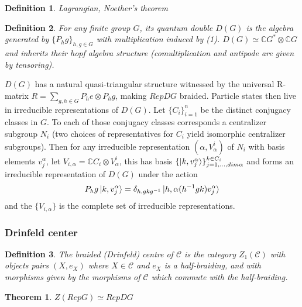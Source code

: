 \documentclass{article}
\newtheorem{definition}{Definition}
\newtheorem{theorem}{Theorem}
\begin{document}
\begin{definition}
Lagrangian, Noether's theorem
\end{definition}
\begin{definition}
For any finite group $G$, its quantum double $D(G)$ is the algebra generated by $\{P_hg\}_{h,g\in G}$ with multiplication induced by (1). $D(G) \simeq \mathbb{C}G^* \otimes \mathbb{C}G$ and inherits their hopf algebra structure (comultiplication and antipode are given by tensoring). 
\end{definition}
$D(G)$ has a natural quasi-triangular structure witnessed by the universal R-matrix $R=\sum_{g,h \in G}P_he \otimes P_hg$, making $RepDG$ braided. Particle states then live in irreducible representations of $D(G)$. Let $\{C_i\}_{i=1}^n$ be the distinct conjugacy classes in $G$. To each of those conjugacy classes corresponds a centralizer subgroup $N_i$ (two choices of representatives for $C_i$ yield isomorphic centralizer subgroups). Then for any irreducible representation $(\alpha,V^i_\alpha)$ of $N_i$ with basis elements $v^\alpha_j$, let $V_{i,\alpha} = \mathbb{C}C_i \otimes V^i_\alpha$, this has basis $\{ \ket{k,v^\alpha_j} \}_{j=1,...,dim\alpha}^{k\in C_i}$ and forms an irreducible representation of $D(G)$ under the action 
\begin{equation}
P_hg\ket{k,v^\alpha_j} = \delta_{h,gkg^{-1}} \ket{h,\alpha(h^{-1}gk)v^\alpha_j}
\end{equation}
and the $\{V_{i,\alpha}\}$ is the complete set of irreducible representations.


\subsubsection{Drinfeld center}
\begin{definition}
The braided (Drinfeld) centre of $\mathcal{C}$ is the category $Z_1(\mathcal{C})$ with objects pairs $(X,e_X)$ where $X \in \mathcal{C}$ and $e_X$ is a half-braiding, and with morphisms given by the morphisms of $\mathcal{C}$ which commute with the half-braiding.
\end{definition}
\begin{theorem}
$Z(RepG) \simeq RepDG$
\end{theorem}
\end{document}
